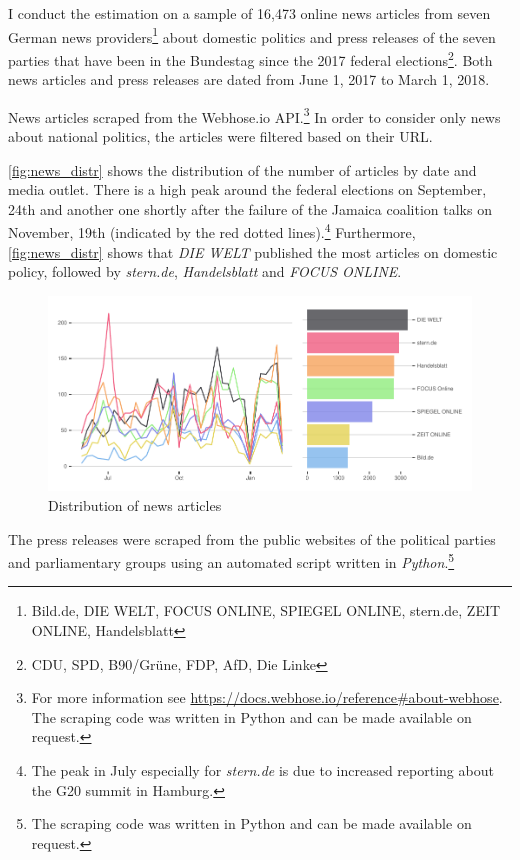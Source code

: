 \documentclass[
]{article}
\begin{document}
I conduct the estimation on a sample of 16,473 online news articles from
seven German news providers\footnote{Bild.de, DIE WELT, FOCUS ONLINE,
  SPIEGEL ONLINE, stern.de, ZEIT ONLINE, Handelsblatt} about domestic
politics and press releases of the seven parties that have been in the
Bundestag since the 2017 federal elections\footnote{CDU, SPD, B90/Grüne,
  FDP, AfD, Die Linke}. Both news articles and press releases are dated
from June 1, 2017 to March 1, 2018.

News articles scraped from the Webhose.io API.\footnote{For more
  information see
  \url{https://docs.webhose.io/reference\#about-webhose}. The scraping
  code was written in Python and can be made available on request.} In
order to consider only news about national politics, the articles were
filtered based on their URL.

\autoref{fig:news_distr} shows the distribution of the number of
articles by date and media outlet. There is a high peak around the
federal elections on September, 24th and another one shortly after the
failure of the Jamaica coalition talks on November, 19th (indicated by
the red dotted lines).\footnote{The peak in July especially for
  \emph{stern.de} is due to increased reporting about the G20 summit in
  Hamburg.} Furthermore, \autoref{fig:news_distr} shows that \emph{DIE
WELT} published the most articles on domestic policy, followed by
\emph{stern.de}, \emph{Handelsblatt} and \emph{FOCUS ONLINE}.

\begin{figure}

{\centering \includegraphics[width=1\linewidth]{main_text_files/figure-latex/news articles-1} 

}

\caption{Distribution of news articles \label{fig:news_distr}}\label{fig:news articles}
\end{figure}

The press releases were scraped from the public websites of the
political parties and parliamentary groups using an automated script
written in \emph{Python}.\footnote{The scraping code was written in
  Python and can be made available on request.}
\end{document}
